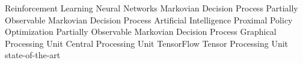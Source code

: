 \begin       {acronym}[Bash]
	         {Reinforcement Learning}
	         {Neural Networks}
	        {Markovian Decision Process}
	      {Partially Observable Markovian Decision Process}
	         {Artificial Intelligence}
	        {Proximal Policy Optimization}
	      {Partially Observable Markovian Decision Process}
	        {Graphical Processing Unit}
	        {Central Processing Unit}
	         {TensorFlow}
	        {Tensor Processing Unit}
	       {state-of-the-art}
\end       {acronym}
